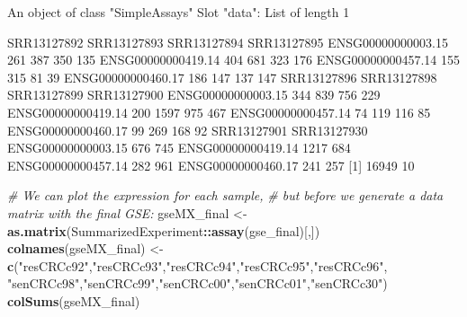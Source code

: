 \documentclass[
]{article}
\newenvironment{Shaded}{\begin{snugshade}}{\end{snugshade}}
\newcommand{\CommentTok}[1]{\textcolor[rgb]{0.56,0.35,0.01}{\textit{#1}}}
\newcommand{\FunctionTok}[1]{\textcolor[rgb]{0.13,0.29,0.53}{\textbf{#1}}}
\newcommand{\NormalTok}[1]{#1}
\newcommand{\OtherTok}[1]{\textcolor[rgb]{0.56,0.35,0.01}{#1}}
\newcommand{\SpecialCharTok}[1]{\textcolor[rgb]{0.81,0.36,0.00}{\textbf{#1}}}
\newcommand{\StringTok}[1]{\textcolor[rgb]{0.31,0.60,0.02}{#1}}
\begin{document}
\begin{Shaded}
\begin{Highlighting}[]
\NormalTok{An object of class "SimpleAssays"}
\NormalTok{Slot "data":}
\NormalTok{List of length 1}

\NormalTok{                   SRR13127892 SRR13127893 SRR13127894 SRR13127895}
\NormalTok{ENSG00000000003.15         261         387         350         135}
\NormalTok{ENSG00000000419.14         404         681         323         176}
\NormalTok{ENSG00000000457.14         155         315          81          39}
\NormalTok{ENSG00000000460.17         186         147         137         147}
\NormalTok{                   SRR13127896 SRR13127898 SRR13127899 SRR13127900}
\NormalTok{ENSG00000000003.15         344         839         756         229}
\NormalTok{ENSG00000000419.14         200        1597         975         467}
\NormalTok{ENSG00000000457.14          74         119         116          85}
\NormalTok{ENSG00000000460.17          99         269         168          92}
\NormalTok{                   SRR13127901 SRR13127930}
\NormalTok{ENSG00000000003.15         676         745}
\NormalTok{ENSG00000000419.14        1217         684}
\NormalTok{ENSG00000000457.14         282         961}
\NormalTok{ENSG00000000460.17         241         257}
\NormalTok{[1] 16949    10}
\end{Highlighting}
\end{Shaded}

\begin{Shaded}
\begin{Highlighting}[]
\CommentTok{\# We can plot the expression for each sample, }
\CommentTok{\# but before we generate a data matrix with the final GSE:}
\NormalTok{gseMX\_final }\OtherTok{\textless{}{-}} \FunctionTok{as.matrix}\NormalTok{(SummarizedExperiment}\SpecialCharTok{::}\FunctionTok{assay}\NormalTok{(gse\_final)[,])}
\FunctionTok{colnames}\NormalTok{(gseMX\_final) }\OtherTok{\textless{}{-}} \FunctionTok{c}\NormalTok{(}\StringTok{"resCRCc92"}\NormalTok{,}\StringTok{"resCRCc93"}\NormalTok{,}\StringTok{"resCRCc94"}\NormalTok{,}\StringTok{"resCRCc95"}\NormalTok{,}\StringTok{"resCRCc96"}\NormalTok{,}
                           \StringTok{"senCRCc98"}\NormalTok{,}\StringTok{"senCRCc99"}\NormalTok{,}\StringTok{"senCRCc00"}\NormalTok{,}\StringTok{"senCRCc01"}\NormalTok{,}\StringTok{"senCRCc30"}\NormalTok{)}
\FunctionTok{colSums}\NormalTok{(gseMX\_final)}
\end{Highlighting}
\end{Shaded}
\end{document}
